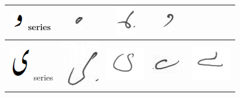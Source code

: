 \begin{table}[h]
\begin{tabular}{@{}ccccc@{}}
\hline
\includegraphics[scale=0.15]{wao_orig} series & \includegraphics[scale=0.15]{74} & \includegraphics[scale=0.15]{75}  & 
\includegraphics[scale=0.15]{76}  & \\
\hline
\includegraphics[scale=0.10]{choti_ye_orig} series & \includegraphics[scale=0.08]{77} & \includegraphics[scale=0.15]{78} & 
\includegraphics[scale=0.15]{79} &
\includegraphics[scale=0.10]{80} \\
\hline
\end{tabular}
\end{table}



